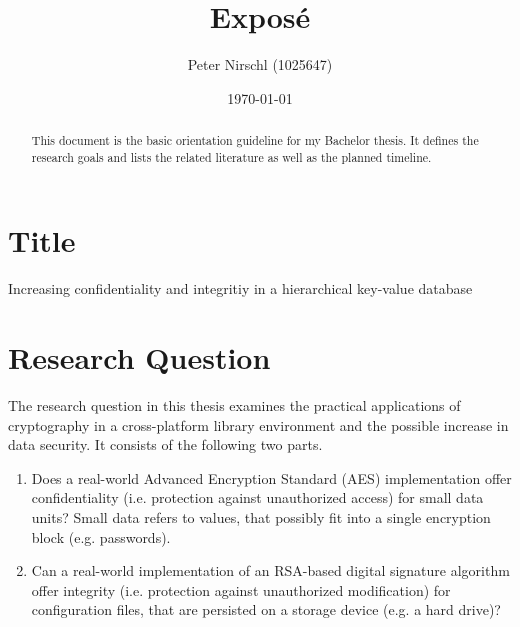 \documentclass[a4paper]{article}
\title{Exposé}
\author{Peter Nirschl (1025647)}
\date{\today} %
\begin{document}
\maketitle
\begin{abstract}
This document is the basic orientation guideline for my Bachelor thesis.
It defines the research goals and lists the related literature as well as the planned timeline.
\end{abstract}
\setcounter{tocdepth}{1} %
\tableofcontents
\newpage

\section{Title}

Increasing confidentiality and integritiy in a hierarchical key-value database


\section{Research Question}

The research question in this thesis examines the practical applications of cryptography in a cross-platform library environment and the possible increase in data security.
It consists of the following two parts.

\begin{enumerate}
\item Does a real-world Advanced Encryption Standard (AES) implementation offer confidentiality (i.e. protection against unauthorized access) for small data units?
Small data refers to values, that possibly fit into a single encryption block (e.g. passwords).
      
\item Can a real-world implementation of an RSA-based digital signature algorithm offer integrity (i.e. protection against unauthorized modification) for configuration files, that are persisted on a storage device (e.g. a hard drive)?

\end{enumerate}
\end{document}
